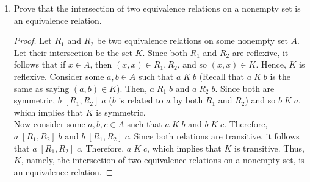 \documentclass[12pt]{article}
\newenvironment{problem}[2][Problem]{\begin{trivlist}
		\item[\hskip \labelsep {\bfseries #1}\hskip \labelsep {\bfseries #2.}]}{\end{trivlist}}
\begin{document}
 	\begin{problem}{41}
 		\begin{enumerate}[label=(\alph*)]
 			\item Prove that the intersection of two equivalence relations on a nonempty set is an equivalence relation.
 			\begin{proof}
 				Let $R_{1}$ and $R_{2}$ be two equivalence relations on some nonempty set $A$. Let their intersection be the set $K$. Since both $R_{1}$ and $R_{2}$ are reflexive, it follows that if $x\in A$, then $(x,x)\in R_{1},R_{2}$, and so $(x,x)\in K$. Hence, $K$ is reflexive. Consider some $a,b\in A$ such that $a\; K \;b$ (Recall that $a\; K \;b$ is the same as saying $(a,b)\in K$). Then, $a\; R_{1} \;b$ and $a\; R_{2} \; b$. Since both are symmetric, $b\; [R_{1},R_{2}]\; a$ ($b$ is related to $a$ by both $R_{1}$ and $R_{2}$) and so $b\; K \;a$, which implies that $K$ is symmetric.\\
 				Now consider some $a,b,c\in A$ such that $a\; K \;b$ and $b\; K \;c$. Therefore, $a \; [R_{1},R_{2}]\; b$ and $b \; [R_{1},R_{2}]\; c$. Since both relations are transitive, it follows that $a\; [R_{1},R_{2}]\;c$. Therefore, $a\; K \; c$, which implies that $K$ is transitive. Thus, $K$, namely, the intersection of two equivalence relations on a nonempty set, is an equivalence relation.
 			\end{proof}
 		\vspace{0.5 cm}
 		

\end{enumerate}
\end{problem}
\end{document}
